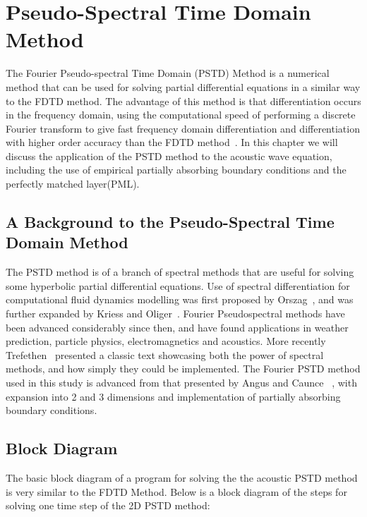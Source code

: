 \newpage
\section{Pseudo-Spectral Time Domain Method}
The Fourier Pseudo-spectral Time Domain (PSTD) Method is a numerical method that can be used for solving partial differential equations in a similar way to the FDTD method. The advantage of this method is that differentiation occurs in the frequency domain, using the computational speed of performing a discrete Fourier transform to give fast frequency domain differentiation and differentiation with higher order accuracy than the FDTD method~\cite{Hornikx2016}. In this chapter we will discuss the application of the PSTD method to the acoustic wave equation, including the use of empirical partially absorbing boundary conditions and the perfectly matched layer(PML).

\subsection{A Background to the Pseudo-Spectral Time Domain Method}
The PSTD method is of a branch of spectral methods that are useful for solving some hyperbolic partial differential equations. Use of spectral differentiation for computational fluid dynamics modelling was first proposed by Orszag~\cite{Orszag1971}, and was further expanded by Kriess and Oliger~\cite{Kreiss1972}. Fourier Pseudospectral methods have been advanced considerably since then, and have found applications in weather prediction, particle physics, electromagnetics and acoustics. More recently Trefethen~\cite{Trefethen2000} presented a classic text showcasing both the power of spectral methods, and how simply they could be implemented. The Fourier PSTD method used in this study is advanced from that presented by Angus and Caunce ~\cite{Angus2010}, with expansion into 2 and 3 dimensions and implementation of partially absorbing boundary conditions. 

\subsection{Block Diagram}
The basic block diagram of a program for solving the the acoustic PSTD method is very similar to the FDTD Method. Below is a block diagram of the steps for solving one time step of the 2D PSTD method:\\


